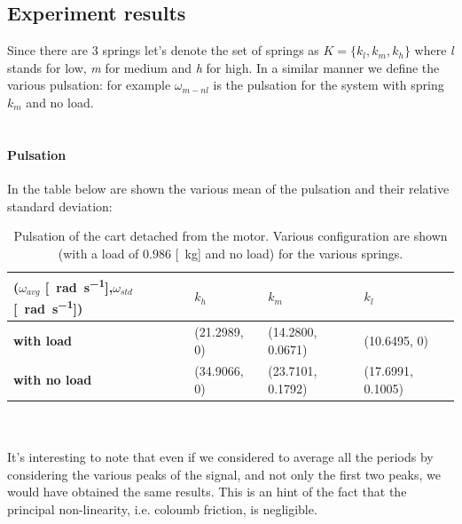 \subsection{Experiment results}
Since there are $3$ springs let's denote the set of springs as $K=\{k_l, k_m, k_h\}$ where \emph{l} stands for low, \emph{m} for medium and \emph{h} for high. In a similar manner we define the various pulsation: for example $\omega_{m-nl}$ is the pulsation for the system with spring $k_m$ and no load.
\\ \\ 
\paragraph{Pulsation}
In the table below are shown the various mean of the pulsation and their relative standard deviation:
\begin{table}[!h]
\centering

\label{table: cart_detached_omega}
\begin{tabular}{|l|l|l|l|}
\hline
{(\textbf{$\omega_{avg}$} [\SI{}{\radian \per \second}],$\omega_{std}$ [\SI{}{\radian \per \second}])} & \textbf{$k_h$} & \textbf{$k_m$}   & \textbf{$k_l$}   \\ \hline
\textbf{with load}         & (21.2989, 0)    & (14.2800, 0.0671) & (10.6495, 0)      \\ \hline
\textbf{with no load}      & (34.9066, 0)    & (23.7101, 0.1792) & (17.6991, 0.1005) \\ \hline
\end{tabular}
\caption{Pulsation of the cart detached from the motor. Various configuration are shown (with a load of $0.986$ [\SI{}{\kilo \gram}] and no load) for the various springs. }
\end{table} \\ \\
It's interesting to note that even if we considered to average all the periods by considering the various peaks of the signal, and not only the first two peaks, we would have obtained the same results. This is an hint of the fact that the principal non-linearity, i.e. coloumb friction, is negligible.

